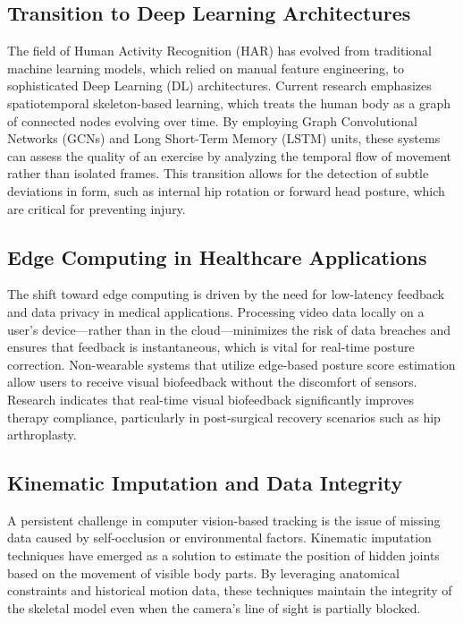\documentclass[conference]{IEEEtran}
\begin{document}
\subsection{Transition to Deep Learning Architectures}
The field of Human Activity Recognition (HAR) has evolved from traditional machine learning models, which relied on manual feature engineering, to sophisticated Deep Learning (DL) architectures. Current research emphasizes spatiotemporal skeleton-based learning, which treats the human body as a graph of connected nodes evolving over time. By employing Graph Convolutional Networks (GCNs) and Long Short-Term Memory (LSTM) units, these systems can assess the quality of an exercise by analyzing the temporal flow of movement rather than isolated frames. This transition allows for the detection of subtle deviations in form, such as internal hip rotation or forward head posture, which are critical for preventing injury.

\subsection{Edge Computing in Healthcare Applications}
The shift toward edge computing is driven by the need for low-latency feedback and data privacy in medical applications. Processing video data locally on a user's device—rather than in the cloud—minimizes the risk of data breaches and ensures that feedback is instantaneous, which is vital for real-time posture correction. Non-wearable systems that utilize edge-based posture score estimation allow users to receive visual biofeedback without the discomfort of sensors. Research indicates that real-time visual biofeedback significantly improves therapy compliance, particularly in post-surgical recovery scenarios such as hip arthroplasty.

\subsection{Kinematic Imputation and Data Integrity}
A persistent challenge in computer vision-based tracking is the issue of missing data caused by self-occlusion or environmental factors. Kinematic imputation techniques have emerged as a solution to estimate the position of hidden joints based on the movement of visible body parts. By leveraging anatomical constraints and historical motion data, these techniques maintain the integrity of the skeletal model even when the camera's line of sight is partially blocked. 
\end{document}
